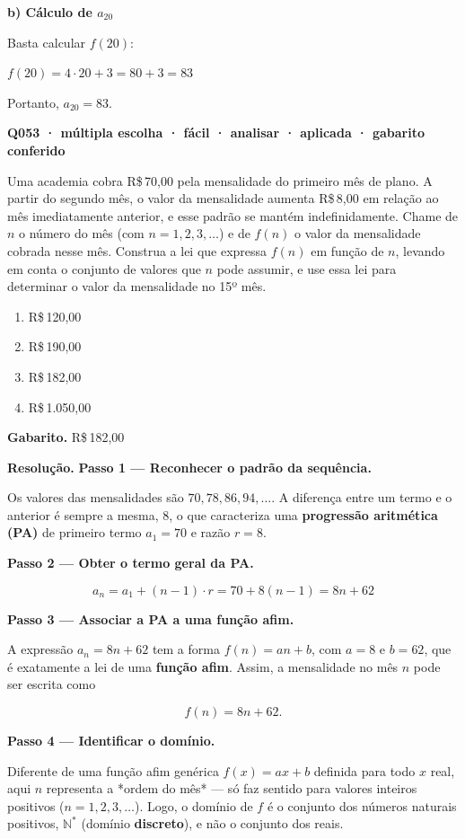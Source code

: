 \documentclass[11pt,a4paper]{article}
\begin{document}
\textbf{b) Cálculo de $a_{20}$}

Basta calcular $f(20)$:

$f(20) = 4 \cdot 20 + 3 = 80 + 3 = 83$

Portanto, $a_{20} = 83$.

\bigskip\noindent\textbf{Q053 · múltipla escolha · fácil · analisar · aplicada · gabarito conferido}\par\nopagebreak
Uma academia cobra R\$\,70,00 pela mensalidade do primeiro mês de plano. A partir do segundo mês, o valor da mensalidade aumenta R\$\,8,00 em relação ao mês imediatamente anterior, e esse padrão se mantém indefinidamente. Chame de $n$ o número do mês (com $n = 1, 2, 3, \dots$) e de $f(n)$ o valor da mensalidade cobrada nesse mês. Construa a lei que expressa $f(n)$ em função de $n$, levando em conta o conjunto de valores que $n$ pode assumir, e use essa lei para determinar o valor da mensalidade no 15º mês.
\begin{enumerate}[label=(\alph*)]
\item R\$\,120,00
\item R\$\,190,00
\item R\$\,182,00
\item R\$\,1.050,00
\end{enumerate}

\textbf{Gabarito.} R\$\,182,00

\textbf{Resolução.} \textbf{Passo 1 — Reconhecer o padrão da sequência.}

Os valores das mensalidades são $70, 78, 86, 94, \dots$. A diferença entre um termo e o anterior é sempre a mesma, $8$, o que caracteriza uma \textbf{progressão aritmética (PA)} de primeiro termo $a_1 = 70$ e razão $r = 8$.

\textbf{Passo 2 — Obter o termo geral da PA.}

$$a_n = a_1 + (n-1)\cdot r = 70 + 8(n-1) = 8n + 62$$

\textbf{Passo 3 — Associar a PA a uma função afim.}

A expressão $a_n = 8n + 62$ tem a forma $f(n) = an + b$, com $a=8$ e $b=62$, que é exatamente a lei de uma \textbf{função afim}. Assim, a mensalidade no mês $n$ pode ser escrita como

$$f(n) = 8n + 62.$$

\textbf{Passo 4 — Identificar o domínio.}

Diferente de uma função afim genérica $f(x) = ax+b$ definida para todo $x$ real, aqui $n$ representa a *ordem do mês* — só faz sentido para valores inteiros positivos ($n=1,2,3,\dots$). Logo, o domínio de $f$ é o conjunto dos números naturais positivos, $\mathbb{N}^\ast$ (domínio \textbf{discreto}), e não o conjunto dos reais.
\end{document}
